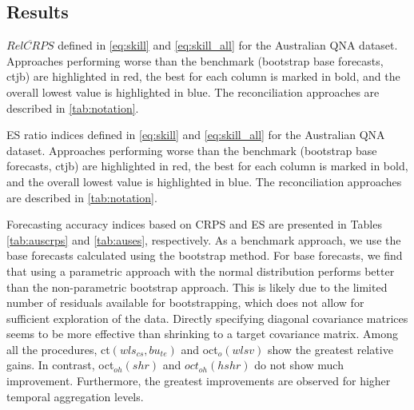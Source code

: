 \documentclass[12pt]{article}
\theoremstyle{definition}
\begin{document}
\subsection{Results}\label{ssec:ausresults}

\begin{table}[!p]
	\centering
	\begingroup
	\fontsize{9}{11}\selectfont
	
	\endgroup
	\caption{$\overline{RelCRPS}$ defined in \eqref{eq:skill} and \eqref{eq:skill_all} for the Australian QNA dataset. Approaches performing worse than the benchmark (bootstrap base forecasts, ctjb) are highlighted in red, the best for each column is marked in bold, and the overall lowest value is highlighted in blue. The reconciliation approaches are described in \autoref{tab:notation}.}
	\label{tab:auscrps}
	\centering
	\begingroup
	\fontsize{9}{11}\selectfont
	
	\endgroup
	\caption{ES ratio indices defined in \eqref{eq:skill} and \eqref{eq:skill_all} for the Australian QNA dataset. Approaches performing worse than the benchmark (bootstrap base forecasts, ctjb) are highlighted in red, the best for each column is marked in bold, and the overall lowest value is highlighted in blue. The reconciliation approaches are described in \autoref{tab:notation}.}
	\label{tab:auses}
	\vspace*{-0.5\baselineskip}
\end{table}

Forecasting accuracy indices based on CRPS and ES are presented in Tables \ref{tab:auscrps} and \ref{tab:auses}, respectively. As a benchmark approach, we use the base forecasts calculated using the bootstrap method. For base forecasts, we find that using a parametric approach with the normal distribution performs better than the non-parametric bootstrap approach. This is likely due to the limited number of residuals available for bootstrapping, which does not allow for sufficient exploration of the data. Directly specifying diagonal covariance matrices seems to be more effective than shrinking to a target covariance matrix. Among all the procedures, ct$(wls_{cs},bu_{te})$ and oct$_o(wlsv)$ show the greatest relative gains. In contrast, oct$_{oh}(shr)$ and $oct_{oh}(hshr)$ do not show much improvement. Furthermore, the greatest improvements are observed for higher temporal aggregation levels.
\end{document}
